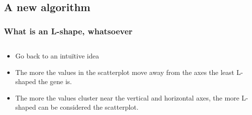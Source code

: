\documentclass[handout]{beamer}
\begin{document}
\subsection{A new algorithm}

\begin{frame}
	\frametitle{What is an L-shape, whatsoever}
\begin{columns}%
	\begin{column}[t]{0.5\textwidth}%
		\bigskip
		\begin{itemize}
			\item Go back to an intuïtive idea
				
					\item The more the values in the scatterplot move away from the axes the least L-shaped the gene is.
					
					\bigskip
					\bigskip
					\bigskip
					\item The more the values cluster near the  vertical and horizontal axes, the more L-shaped can be considered the scatterplot.
		\end{itemize}
		

\end{column}
\end{columns}
\end{frame}
\end{document}
